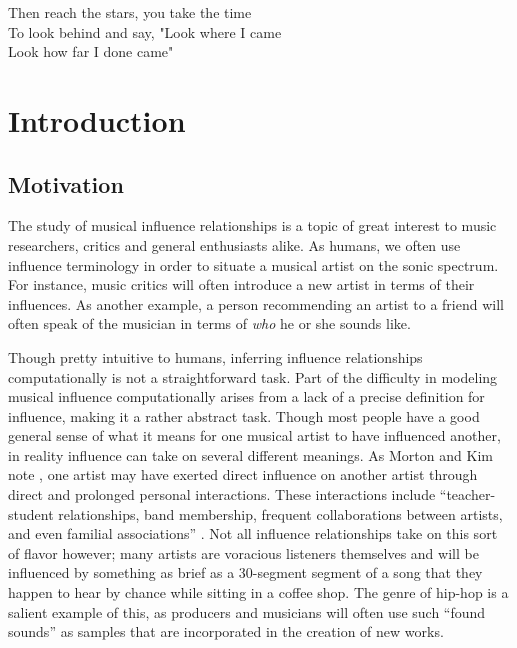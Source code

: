 \begin{savequote}[75mm] 
Then reach the stars, you take the time\\
To look behind and say, "Look where I came\\
Look how far I done came"
\end{savequote}

\chapter{Introduction}

\section{Motivation}
The study of musical influence relationships is a topic of great interest to music researchers, critics and general enthusiasts alike. As humans, we often use influence terminology in order to situate a musical artist on the sonic spectrum. For instance, music critics will often introduce a new artist in terms of their influences. As another example, a person recommending an artist to a friend will often speak of the musician in terms of \textit{who} he or she sounds like. 

Though pretty intuitive to humans, inferring influence relationships computationally is not a straightforward task. Part of the difficulty in modeling musical influence computationally arises from a lack of a precise definition for influence, making it a rather abstract task. Though most people have a good general sense of what it means for one musical artist to have influenced another, in reality influence can take on several different meanings. As Morton and Kim note \cite{morton2015acoustic}, one artist may have exerted direct influence on another artist through direct and prolonged personal interactions. These interactions include ``teacher-student relationships, band membership, frequent collaborations between artists, and even familial associations'' \cite{morton2015acoustic}. Not all influence relationships take on this sort of flavor however; many artists are voracious listeners themselves and will be influenced by something as brief as a 30-segment segment of a song that they happen to hear by chance while sitting in a coffee shop. The genre of hip-hop is a salient example of this, as producers and musicians will often use such ``found sounds'' as samples that are incorporated in the creation of new works. 

